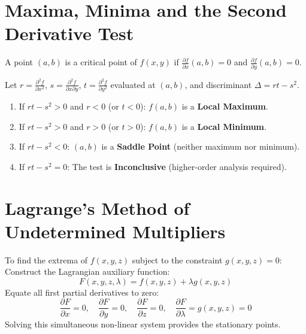 \section{Maxima, Minima and the Second Derivative Test}
\begin{definition}
A point $(a,b)$ is a critical point of $f(x,y)$ if $\frac{\partial f}{\partial x}(a,b) = 0$ and $\frac{\partial f}{\partial y}(a,b) = 0$.
\end{definition}

Let $r = \frac{\partial^2 f}{\partial x^2}$, $s = \frac{\partial^2 f}{\partial x \partial y}$, $t = \frac{\partial^2 f}{\partial y^2}$ evaluated at $(a,b)$, and discriminant $\Delta = rt - s^2$.
\begin{theorem}
\begin{enumerate}
    \item If $rt - s^2 > 0$ and $r < 0$ (or $t < 0$): $f(a,b)$ is a \textbf{Local Maximum}.
    \item If $rt - s^2 > 0$ and $r > 0$ (or $t > 0$): $f(a,b)$ is a \textbf{Local Minimum}.
    \item If $rt - s^2 < 0$: $(a,b)$ is a \textbf{Saddle Point} (neither maximum nor minimum).
    \item If $rt - s^2 = 0$: The test is \textbf{Inconclusive} (higher-order analysis required).
\end{enumerate}
\end{theorem}

\section{Lagrange's Method of Undetermined Multipliers}
To find the extrema of $f(x,y,z)$ subject to the constraint $g(x,y,z) = 0$:
Construct the Lagrangian auxiliary function:
\begin{equation}
F(x, y, z, \lambda) = f(x, y, z) + \lambda g(x, y, z)
\end{equation}
Equate all first partial derivatives to zero:
\begin{equation}
\frac{\partial F}{\partial x} = 0, \quad \frac{\partial F}{\partial y} = 0, \quad \frac{\partial F}{\partial z} = 0, \quad \frac{\partial F}{\partial \lambda} = g(x,y,z) = 0
\end{equation}
Solving this simultaneous non-linear system provides the stationary points.
